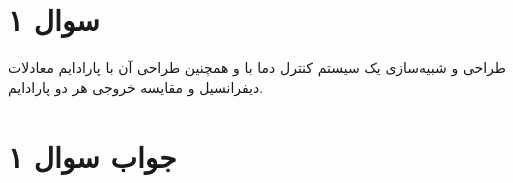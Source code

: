 \section*{سوال ۱}

طراحی و شبیه‌سازی یک سیستم کنترل دما
با
و همچنین طراحی آن با پارادایم معادلات دیفرانسیل و مقایسه خروجی هر دو پارادایم.


\section*{جواب سوال ۱}

